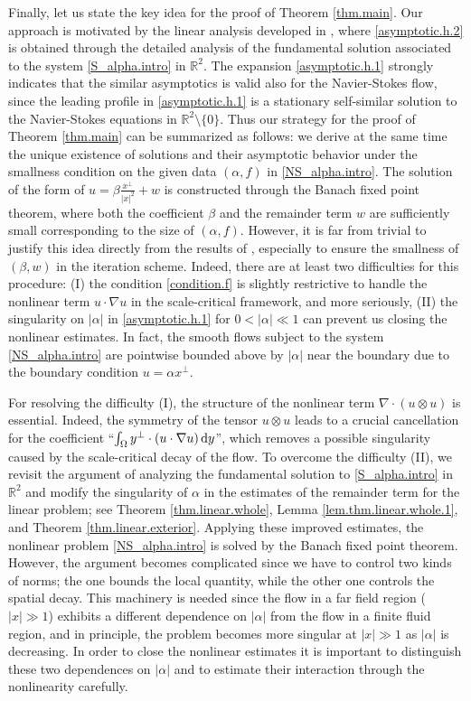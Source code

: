 \documentclass[11pt,a4paper]{article}
\newcommand{\R}{\mathbb{R}}
\newcommand{\dd}{\,{\rm d}}
\begin{document}
Finally, let us state the key idea for the proof of Theorem \ref{thm.main}. Our approach is motivated by the linear analysis developed in \cite{H3}, where \eqref{asymptotic.h.2} is obtained through the detailed analysis of the fundamental solution associated to the system \eqref{S_alpha.intro} in $\R^2$. The expansion \eqref{asymptotic.h.1} strongly indicates that 
the similar asymptotics is valid also for the Navier-Stokes flow, since the leading profile in \eqref{asymptotic.h.1} is a stationary self-similar solution to the Navier-Stokes equations in $\R^2\setminus\{0\}$. Thus our strategy for the proof of Theorem \ref{thm.main} can be summarized as follows: we derive at the same time the unique existence of solutions and their asymptotic behavior under the smallness condition on the given data $(\alpha,f)$ in \eqref{NS_alpha.intro}. The solution of the form of $u=\beta \frac{x^\bot}{|x|^2} + w$ is constructed through the Banach fixed point theorem, where  both the coefficient $\beta$ and the remainder term $w$ are sufficiently small corresponding to the size of $(\alpha,f)$. 
However, it is far from trivial to justify this idea directly from the results of \cite{H3}, 
especially to ensure the smallness of $(\beta, w)$ in the iteration scheme.
Indeed, there are at least two difficulties for this procedure: (I)
the condition \eqref{condition.f} is slightly restrictive to handle the nonlinear term $u\cdot \nabla u$ in the scale-critical framework, and more seriously, (II) the singularity on $|\alpha|$ in \eqref{asymptotic.h.1} for $0<|\alpha|\ll 1$ can prevent us closing the nonlinear estimates. In fact, the smooth flows subject to the system \eqref{NS_alpha.intro} are pointwise bounded above by $|\alpha|$ near the boundary due to the boundary condition $u= \alpha x^\bot$. 


For resolving the difficulty (I), the structure of the nonlinear term $\nabla\cdot (u\otimes u)$ is essential.
Indeed, the symmetry of the tensor $u\otimes u$ leads to a crucial cancellation for the coefficient ``$\int_\Omega y^\bot \cdot (u\cdot \nabla u) \dd y$'', which removes a possible singularity caused by the scale-critical decay of the flow. 
To overcome the difficulty (II), we revisit 
the argument of \cite{H3} analyzing the fundamental solution to \eqref{S_alpha.intro} in $\R^2$
and 
modify the singularity of $\alpha$ in
the estimates of the remainder term for the linear problem; see Theorem \ref{thm.linear.whole}, Lemma \ref{lem.thm.linear.whole.1}, and Theorem \ref{thm.linear.exterior}.
Applying these improved estimates, the nonlinear problem \eqref{NS_alpha.intro} is solved 
by the Banach fixed point theorem.
However,
the argument becomes complicated since we have to control two kinds of norms; 
the one bounds the local quantity, while the other one controls the spatial decay. 
This machinery is needed since the flow in a far field region ($|x|\gg 1$) exhibits a different dependence on $|\alpha|$ from the flow in a finite fluid region, and in principle, the problem becomes more singular at $|x|\gg 1$ as $|\alpha|$ is decreasing. In order to close the nonlinear estimates it is important to distinguish these two dependences on $|\alpha|$
and to estimate their interaction through the nonlinearity carefully. 
\end{document}
